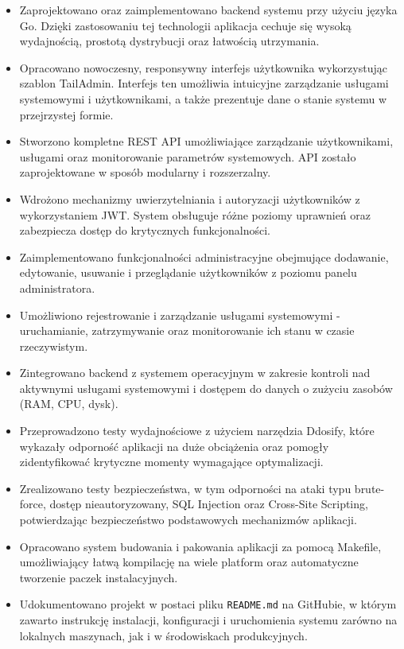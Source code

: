 \begin{itemize}
    \item Zaprojektowano oraz zaimplementowano backend systemu przy użyciu języka Go. Dzięki zastosowaniu tej technologii aplikacja cechuje się wysoką wydajnością, prostotą dystrybucji oraz łatwością utrzymania.
    \item Opracowano nowoczesny, responsywny interfejs użytkownika wykorzystując szablon TailAdmin. Interfejs ten umożliwia intuicyjne zarządzanie usługami systemowymi i użytkownikami, a także prezentuje dane o stanie systemu w przejrzystej formie.
    \item Stworzono kompletne REST API umożliwiające zarządzanie użytkownikami, usługami oraz monitorowanie parametrów systemowych. API zostało zaprojektowane w sposób modularny i rozszerzalny.
    \item Wdrożono mechanizmy uwierzytelniania i autoryzacji użytkowników z wykorzystaniem JWT. System obsługuje różne poziomy uprawnień oraz zabezpiecza dostęp do krytycznych funkcjonalności.
    \item Zaimplementowano funkcjonalności administracyjne obejmujące dodawanie, edytowanie, usuwanie i przeglądanie użytkowników z poziomu panelu administratora.
    \item Umożliwiono rejestrowanie i zarządzanie usługami systemowymi - uruchamianie, zatrzymywanie oraz monitorowanie ich stanu w czasie rzeczywistym.
    \item Zintegrowano backend z systemem operacyjnym w zakresie kontroli nad aktywnymi usługami systemowymi i dostępem do danych o zużyciu zasobów (RAM, CPU, dysk).
    \item Przeprowadzono testy wydajnościowe z użyciem narzędzia Ddosify, które wykazały odporność aplikacji na duże obciążenia oraz pomogły zidentyfikować krytyczne momenty wymagające optymalizacji.
    \item Zrealizowano testy bezpieczeństwa, w tym odporności na ataki typu brute-force, dostęp nieautoryzowany, SQL Injection oraz Cross-Site Scripting, potwierdzając bezpieczeństwo podstawowych mechanizmów aplikacji.
    \item Opracowano system budowania i pakowania aplikacji za pomocą Makefile, umożliwiający łatwą kompilację na wiele platform oraz automatyczne tworzenie paczek instalacyjnych.
    \item Udokumentowano projekt w postaci pliku \texttt{README.md} na GitHubie, w którym zawarto instrukcję instalacji, konfiguracji i uruchomienia systemu zarówno na lokalnych maszynach, jak i w środowiskach produkcyjnych.
\end{itemize}

